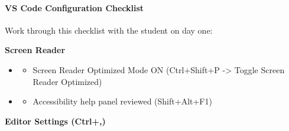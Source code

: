 \documentclass[
  justified,
  openright,
]{tufte-book}
\let\subsection\paragraph
\let\paragraph\paragraph
\let\subsection\paragraph
\let\paragraph\paragraph
\providecommand{\tightlist}{%
  \setlength{\itemsep}{0pt}\setlength{\parskip}{0pt}}
\begin{document}
\subsection{VS Code Configuration
Checklist}\label{vs-code-configuration-checklist}

Work through this checklist with the student on day one:

\textbf{Screen Reader}

\begin{itemize}
\tightlist
\item
  \begin{itemize}
  \tightlist
  \item[$\square$]
    Screen Reader Optimized Mode ON (Ctrl+Shift+P -\textgreater{} Toggle
    Screen Reader Optimized)
  \end{itemize}
\item
  \begin{itemize}
  \tightlist
  \item[$\square$]
    Accessibility help panel reviewed (Shift+Alt+F1)
  \end{itemize}
\end{itemize}

\textbf{Editor Settings (Ctrl+,)}
\end{document}
